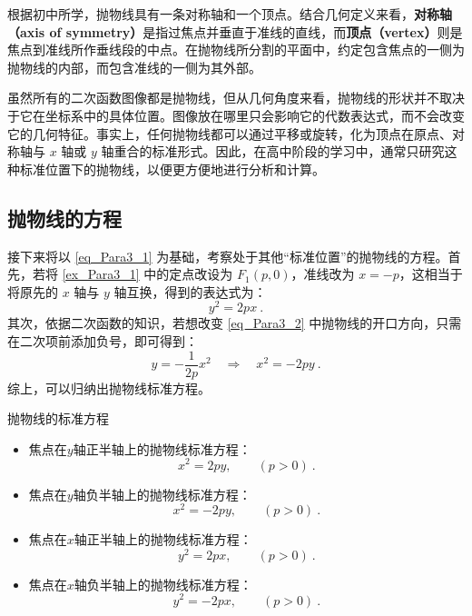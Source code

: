 根据初中所学，抛物线具有一条对称轴和一个顶点。结合几何定义来看，\textbf{对称轴（axis of symmetry）}是指过焦点并垂直于准线的直线，而\textbf{顶点（vertex）}则是焦点到准线所作垂线段的中点。在抛物线所分割的平面中，约定包含焦点的一侧为抛物线的内部，而包含准线的一侧为其外部。

虽然所有的二次函数图像都是抛物线，但从几何角度来看，抛物线的形状并不取决于它在坐标系中的具体位置。图像放在哪里只会影响它的代数表达式，而不会改变它的几何特征。事实上，任何抛物线都可以通过平移或旋转，化为顶点在原点、对称轴与 $x$ 轴或 $y$ 轴重合的标准形式。因此，在高中阶段的学习中，通常只研究这种标准位置下的抛物线，以便更方便地进行分析和计算。

\subsection{抛物线的方程}

接下来将以 \autoref{eq_Para3_1} 为基础，考察处于其他“标准位置”的抛物线的方程。首先，若将 \autoref{ex_Para3_1} 中的定点改设为 $F_1(p,0)$，准线改为 $x = -p$，这相当于将原先的 $x$ 轴与 $y$ 轴互换，得到的表达式为：
\begin{equation}\label{eq_Para3_5}
y^2 = 2px~.
\end{equation}
其次，依据二次函数的知识，若想改变 \autoref{eq_Para3_2} 中抛物线的开口方向，只需在二次项前添加负号，即可得到：
\begin{equation}
y = -\frac{1}{2p}x^2 \quad \Longrightarrow \quad x^2 = -2py~.
\end{equation}
综上，可以归纳出抛物线标准方程。

\begin{theorem}{抛物线的标准方程}\label{the_Para3_1}
\begin{itemize}
\item 焦点在$y$轴正半轴上的抛物线标准方程：
\begin{equation}
x^2=2py,\qquad(p>0)~.
\end{equation}
\item 焦点在$y$轴负半轴上的抛物线标准方程：
\begin{equation}
x^2=-2py,\qquad(p>0)~.
\end{equation}
\item 焦点在$x$轴正半轴上的抛物线标准方程：
\begin{equation}\label{eq_Para3_3}
y^2=2px,\qquad(p>0)~.
\end{equation}
\item 焦点在$x$轴负半轴上的抛物线标准方程：
\begin{equation}
y^2=-2px,\qquad(p>0)~.
\end{equation}
\end{itemize}
\end{theorem}

